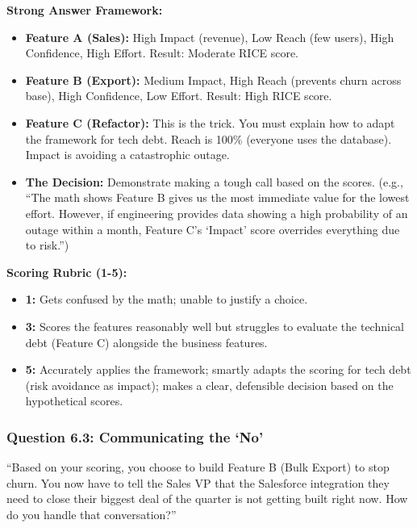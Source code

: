 \documentclass[
  11pt,
  openany,
  oneside]{book}
\providecommand{\tightlist}{%
  \setlength{\itemsep}{0pt}\setlength{\parskip}{0pt}}
\begin{document}
\textbf{Strong Answer Framework:}

\begin{itemize}
\tightlist
\item
  \textbf{Feature A (Sales):} High Impact (revenue), Low Reach (few
  users), High Confidence, High Effort. Result: Moderate RICE score.
\item
  \textbf{Feature B (Export):} Medium Impact, High Reach (prevents churn
  across base), High Confidence, Low Effort. Result: High RICE score.
\item
  \textbf{Feature C (Refactor):} This is the trick. You must explain how
  to adapt the framework for tech debt. Reach is 100\% (everyone uses
  the database). Impact is avoiding a catastrophic outage.
\item
  \textbf{The Decision:} Demonstrate making a tough call based on the
  scores. (e.g., ``The math shows Feature B gives us the most immediate
  value for the lowest effort. However, if engineering provides data
  showing a high probability of an outage within a month, Feature C's
  `Impact' score overrides everything due to risk.'')
\end{itemize}

\textbf{Scoring Rubric (1-5):}

\begin{itemize}
\tightlist
\item
  \textbf{1:} Gets confused by the math; unable to justify a choice.
\item
  \textbf{3:} Scores the features reasonably well but struggles to
  evaluate the technical debt (Feature C) alongside the business
  features.
\item
  \textbf{5:} Accurately applies the framework; smartly adapts the
  scoring for tech debt (risk avoidance as impact); makes a clear,
  defensible decision based on the hypothetical scores.
\end{itemize}

\subsubsection{Question 6.3: Communicating the
`No'}\label{question-6.3-communicating-the-no}

``Based on your scoring, you choose to build Feature B (Bulk Export) to
stop churn. You now have to tell the Sales VP that the Salesforce
integration they need to close their biggest deal of the quarter is not
getting built right now. How do you handle that conversation?''
\end{document}

